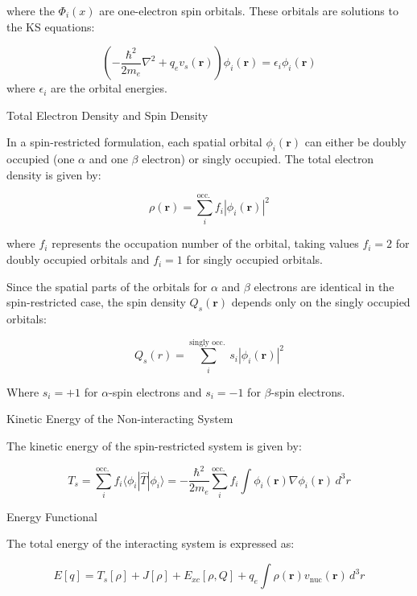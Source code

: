 \documentclass[%
 preprint, linenumbers,
 amsmath,amssymb,
 aps, physrev,
]{revtex4-2}
\begin{document}
where the \( \Phi_i(x) \) are one-electron spin orbitals. These orbitals are solutions to the KS equations:

\begin{equation}
    \left( -\frac{\hbar^2}{2m_e} \nabla^2+ q_e v_s(\mathbf{r}) \right) \phi_i(\mathbf{r}) = \epsilon_i \phi_i(\mathbf{r})
\end{equation}
where \( \epsilon_i \) are the orbital energies.

 Total Electron Density and Spin Density

In a spin-restricted formulation, each spatial orbital \( \phi_i(\mathbf{r}) \) can either be doubly occupied (one \( \alpha \) and one \( \beta \) electron) or singly occupied. The total electron density is given by:

\begin{equation}
    \rho(\mathbf{r}) = \sum_i^{\text{occ. } } f_i |\phi_i(\mathbf{r})|^2
\end{equation}

where \( f_i \) represents the occupation number of the orbital, taking values \( f_i = 2 \) for doubly occupied orbitals and \( f_i = 1 \) for singly occupied orbitals.

Since the spatial parts of the orbitals for \( \alpha \) and \( \beta \) electrons are identical in the spin-restricted case, the spin density \( Q_s(\mathbf{r}) \) depends only on the singly occupied orbitals:

\begin{equation}
    Q_s(r) = \sum_i^{\text{singly occ. } } s_i |\phi_i(\mathbf{r})|^2
\end{equation}

Where \( s_i = +1 \) for \( \alpha \)-spin electrons and \( s_i = -1 \) for \( \beta \)-spin electrons.

 Kinetic Energy of the Non-interacting System

The kinetic energy of the spin-restricted system is given by:


\begin{equation}
    T_s = \sum_i^{\text{occ. }} f_i \langle \phi_i | \hat{T} | \phi_i \rangle = -\frac{\hbar^2}{2m_e} \sum_i^{\text{occ. } } f_i \int \phi_i(\mathbf{r}) \nabla \phi_i(\mathbf{r}) \, d^3r
\end{equation}


 Energy Functional

The total energy of the interacting system is expressed as:

\begin{equation}
    E[q] = T_s[\rho] + J[\rho] + E_{xc}[\rho,Q] + q_e \int \rho(\mathbf{r}) v_{\text{nuc}}(\mathbf{r}) \, d^3r
\end{equation}
\end{document}
